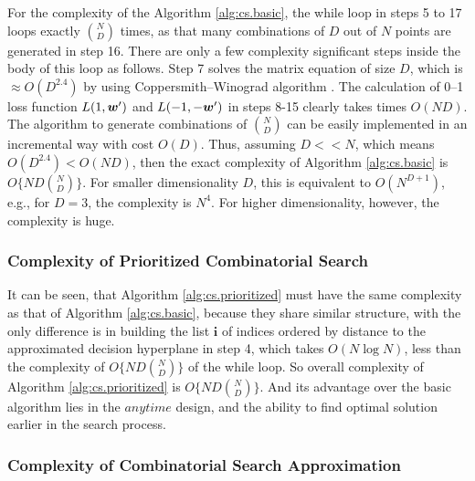 For the complexity of the Algorithm \ref{alg:cs.basic}, the while loop in steps 5 to 17 loops exactly ${N \choose D}$ times, as that many combinations of $D$ out of $N$ points are generated in step 16. There are only a few complexity significant steps inside the body of this loop as follows. Step 7 solves the matrix equation of size $D$, which is $\approx O(D^{2.4})$ by using Coppersmith--Winograd algorithm \cite{Coppersmith}. The calculation of 0--1 loss function $L(1,\boldsymbol{w}')$ and $L(-1,-\boldsymbol{w}')$ in steps 8-15 clearly takes times $O(ND)$. The algorithm to generate combinations of ${N \choose D}$ can be easily implemented in an incremental way with cost $O(D)$. Thus, assuming $D << N$, which means $O(D^{2.4}) < O(ND)$, then the exact complexity of Algorithm \ref{alg:cs.basic} is $O\{ ND{N \choose D} \}$. For smaller dimensionality $D$, this is equivalent to $O(N^{D+1})$, e.g., for $D=3$, the complexity is $N^4$. For higher dimensionality, however, the complexity is huge.

\subsubsection{Complexity of Prioritized Combinatorial Search}

It can be seen, that Algorithm \ref{alg:cs.prioritized} must have the same complexity as that of Algorithm \ref{alg:cs.basic}, because they share similar structure, with the only difference is in building the list $\boldsymbol{i}$ of indices ordered by distance to the approximated decision hyperplane in step 4, which takes $O(N \log N)$, less than the complexity of $O\{ ND{N \choose D} \}$ of the while loop. So overall complexity of Algorithm \ref{alg:cs.prioritized} is $O\{ ND{N \choose D} \}$. And its advantage over the basic algorithm lies in the $anytime$ design, and the ability to find optimal solution earlier in the search process.

\subsubsection{Complexity of Combinatorial Search Approximation}

